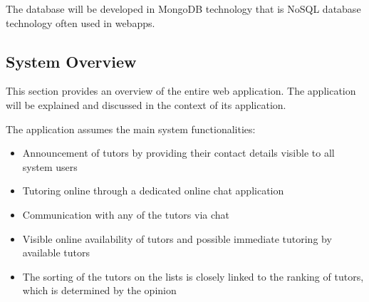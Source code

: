 The database will be developed in MongoDB technology that is NoSQL database technology often used in webapps.


\subsection{System Overview}


This section provides an overview of the entire web application. The application will be explained and discussed in the context of its application.



The application assumes the main system functionalities:
\begin{itemize}
    \item Announcement of tutors by providing their contact details visible to all system users
    \item Tutoring online through a dedicated online chat application
    \item Communication with any of the tutors via chat
    \item Visible online availability of tutors and possible immediate tutoring by available tutors
    \item The sorting of the tutors on the lists is closely linked to the ranking of tutors, which is determined by the opinion
\end{itemize}








